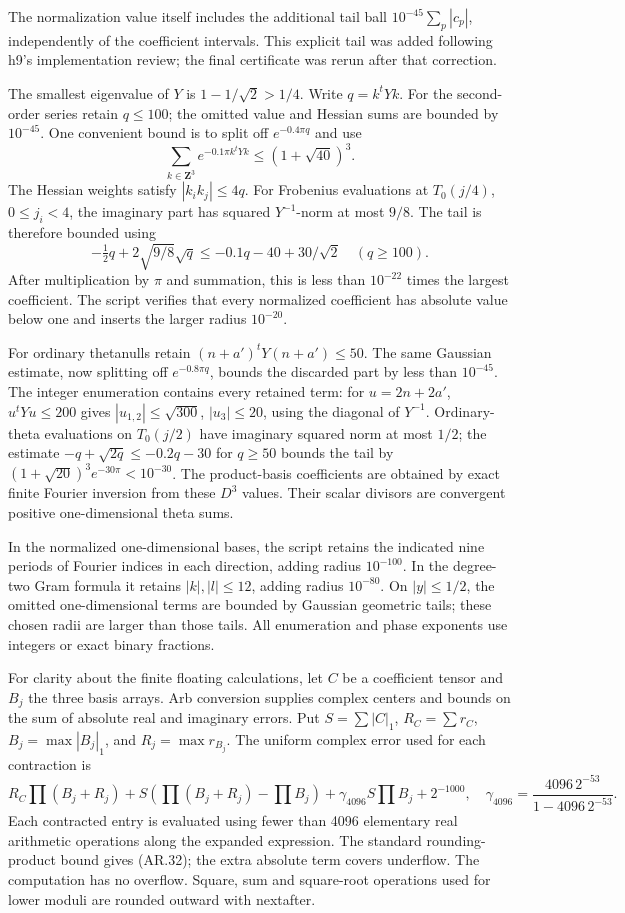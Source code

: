 The normalization value itself includes the additional tail ball
\(10^{-45}\sum_p|c_p|\), independently of the coefficient intervals.
This explicit tail was added following h9's implementation review; the
final certificate was rerun after that correction.

The smallest eigenvalue of \(Y\) is \(1-1/\sqrt2>1/4\). Write
\(q=k^tYk\). For the second-order series retain \(q\le100\); the omitted
value and Hessian sums are bounded by \(10^{-45}\). One convenient bound
is to split off \(e^{-0.4\pi q}\) and use \[
\sum_{k\in\mathbf Z^3}e^{-0.1\pi k^tYk}
\le(1+\sqrt{40})^3.
\] The Hessian weights satisfy \(|k_ik_j|\le4q\). For Frobenius
evaluations at \(T_0(j/4)\), \(0\le j_i<4\), the imaginary part has
squared \(Y^{-1}\)-norm at most \(9/8\). The tail is therefore bounded
using \[
-\tfrac12q+2\sqrt{9/8}\sqrt q
\le-0.1q-40+30/\sqrt2\quad(q\ge100).
\] After multiplication by \(\pi\) and summation, this is less than
\(10^{-22}\) times the largest coefficient. The script verifies that
every normalized coefficient has absolute value below one and inserts
the larger radius \(10^{-20}\).

For ordinary thetanulls retain \((n+a')^tY(n+a')\le50\). The same
Gaussian estimate, now splitting off \(e^{-0.8\pi q}\), bounds the
discarded part by less than \(10^{-45}\). The integer enumeration
contains every retained term: for \(u=2n+2a'\), \(u^tYu\le200\) gives
\(|u_{1,2}|\le\sqrt{300}\), \(|u_3|\le20\), using the diagonal of
\(Y^{-1}\). Ordinary-theta evaluations on \(T_0(j/2)\) have imaginary
squared norm at most \(1/2\); the estimate \(-q+\sqrt{2q}\le-0.2q-30\)
for \(q\ge50\) bounds the tail by
\((1+\sqrt{20})^3e^{-30\pi}<10^{-30}\). The product-basis coefficients
are obtained by exact finite Fourier inversion from these \(D^3\)
values. Their scalar divisors are convergent positive one-dimensional
theta sums.

In the normalized one-dimensional bases, the script retains the
indicated nine periods of Fourier indices in each direction, adding
radius \(10^{-100}\). In the degree-two Gram formula it retains
\(|k|,|l|\le12\), adding radius \(10^{-80}\). On \(|y|\le1/2\), the
omitted one-dimensional terms are bounded by Gaussian geometric tails;
these chosen radii are larger than those tails. All enumeration and
phase exponents use integers or exact binary fractions.

For clarity about the finite floating calculations, let \(C\) be a
coefficient tensor and \(B_j\) the three basis arrays. Arb conversion
supplies complex centers and bounds on the sum of absolute real and
imaginary errors. Put \(S=\sum|C|_1\), \(R_C=\sum r_C\),
\(B_j=\max|B_j|_1\), and \(R_j=\max r_{B_j}\). The uniform complex error
used for each contraction is \[
R_C\prod(B_j+R_j)
 +S\left(\prod(B_j+R_j)-\prod B_j\right)
 +\gamma_{4096}S\prod B_j+2^{-1000},
\quad
\gamma_{4096}=\frac{4096\,2^{-53}}{1-4096\,2^{-53}}.
\tag{AR.32}
\] Each contracted entry is evaluated using fewer than 4096 elementary
real arithmetic operations along the expanded expression. The standard
rounding-product bound gives (AR.32); the extra absolute term covers
underflow. The computation has no overflow. Square, sum and square-root
operations used for lower moduli are rounded outward with nextafter.

